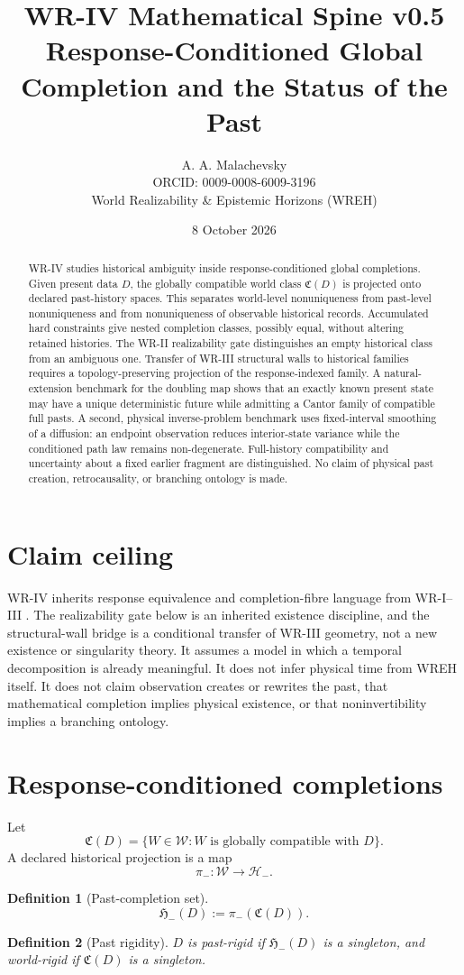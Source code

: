 \documentclass[11pt]{article}
\title{\textbf{WR-IV Mathematical Spine v0.5}\\[4pt]\large Response-Conditioned Global Completion and the Status of the Past}
\author{A. A. Malachevsky\\ORCID: 0009-0008-6009-3196\\World Realizability \& Epistemic Horizons (WREH)}
\date{8 October 2026}
\newtheorem{definition}{Definition}[section]
\newcommand{\Wcal}{\mathcal W}
\newcommand{\Ccal}{\mathfrak C}
\newcommand{\Hminus}{\mathcal H_-}
\newcommand{\Pcal}{\mathfrak H_-}
\begin{document}
\maketitle

\begin{abstract}
WR-IV studies historical ambiguity inside response-conditioned global completions. Given present data $D$, the globally compatible world class $\Ccal(D)$ is projected onto declared past-history spaces. This separates world-level nonuniqueness from past-level nonuniqueness and from nonuniqueness of observable historical records. Accumulated hard constraints give nested completion classes, possibly equal, without altering retained histories. The WR-II realizability gate distinguishes an empty historical class from an ambiguous one. Transfer of WR-III structural walls to historical families requires a topology-preserving projection of the response-indexed family. A natural-extension benchmark for the doubling map shows that an exactly known present state may have a unique deterministic future while admitting a Cantor family of compatible full pasts. A second, physical inverse-problem benchmark uses fixed-interval smoothing of a diffusion: an endpoint observation reduces interior-state variance while the conditioned path law remains non-degenerate. Full-history compatibility and uncertainty about a fixed earlier fragment are distinguished. No claim of physical past creation, retrocausality, or branching ontology is made.
\end{abstract}

\section{Claim ceiling}
WR-IV inherits response equivalence and completion-fibre language from
WR-I--III \cite{WRI,WRII,WRIII}. The realizability gate below is an
inherited existence discipline, and the structural-wall bridge is a
conditional transfer of WR-III geometry, not a new existence or
singularity theory. It assumes a model in which a temporal
decomposition is already meaningful. It does not infer physical time from WREH itself. It does not claim observation creates or rewrites the past, that mathematical completion implies physical existence, or that noninvertibility implies a branching ontology.

\section{Response-conditioned completions}
Let
\[
\Ccal(D)=\{W\in\Wcal: W\text{ is globally compatible with }D\}.
\]
A declared historical projection is a map
\[
\pi_-:\Wcal\to\Hminus.
\]
\begin{definition}[Past-completion set]
\[
\Pcal(D):=\pi_-(\Ccal(D)).
\]
\end{definition}
\begin{definition}[Past rigidity]
$D$ is past-rigid if $\Pcal(D)$ is a singleton, and world-rigid if $\Ccal(D)$ is a singleton.
\end{definition}
\end{document}
